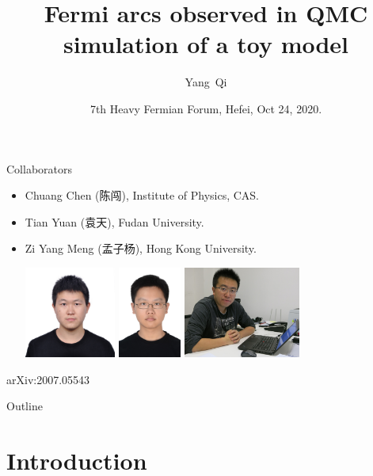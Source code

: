 \documentclass[xcolor=table, 10pt, aspectratio=1610]{beamer}
\title[EQMC] %
{Fermi arcs observed in QMC simulation of a toy model}
\author[Y Qi] %
{Yang~Qi}
\institute[Fudan] %
{
Department of Physics, Fudan University.
}
\date{7th Heavy Fermian Forum, Hefei, Oct 24, 2020.}
\begin{document}
\begin{frame}
  \titlepage
\end{frame}

\begin{frame}{Collaborators}
\begin{itemize}
\item Chuang Chen (陈闯), Institute of Physics, CAS.
\item Tian Yuan (袁天), Fudan University.
\item Zi Yang Meng (孟子杨), Hong Kong University.
\begin{center}
  \includegraphics[height=3cm]{../people/chuangchen}
  \includegraphics[height=3cm]{../people/tianyuan}
  \includegraphics[height=3cm]{../people/ziyangmeng}
\end{center}
\end{itemize}
\begin{center}
  \small arXiv:2007.05543
\end{center}
\end{frame}

\begin{frame}{Outline}
		\tableofcontents
\end{frame}

\section{Introduction}
\end{document}
